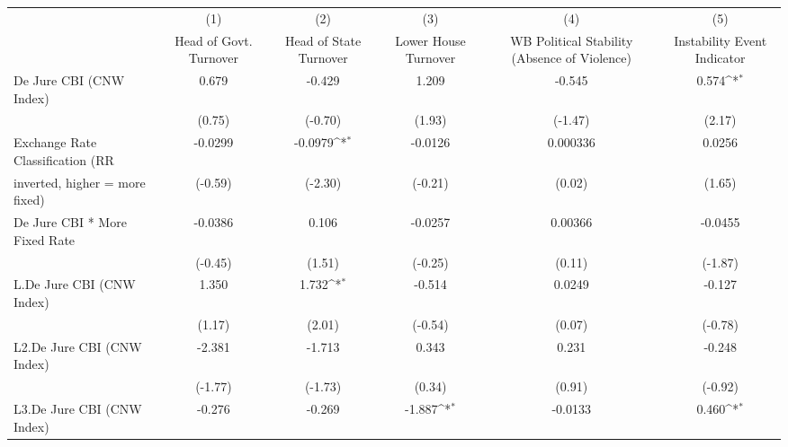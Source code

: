 {
\def\sym#1{\ifmmode^{#1}\else\(^{#1}\)\fi}
\begin{tabular}{l*{5}{c}}
\toprule
                                        &\multicolumn{1}{c}{(1)}&\multicolumn{1}{c}{(2)}&\multicolumn{1}{c}{(3)}&\multicolumn{1}{c}{(4)}&\multicolumn{1}{c}{(5)}\\
                                        &\multicolumn{1}{c}{Head of Govt. Turnover}&\multicolumn{1}{c}{Head of State Turnover}&\multicolumn{1}{c}{Lower House Turnover}&\multicolumn{1}{c}{WB Political Stability (Absence of Violence)}&\multicolumn{1}{c}{Instability Event Indicator}\\
\midrule
De Jure CBI (CNW Index)                 &     0.679         &    -0.429         &     1.209         &    -0.545         &     0.574\sym{*}  \\
                                        &    (0.75)         &   (-0.70)         &    (1.93)         &   (-1.47)         &    (2.17)         \\
\addlinespace
Exchange Rate Classification (RR        &   -0.0299         &   -0.0979\sym{*}  &   -0.0126         &  0.000336         &    0.0256         \\
inverted, higher = more fixed)          &   (-0.59)         &   (-2.30)         &   (-0.21)         &    (0.02)         &    (1.65)         \\
\addlinespace
De Jure CBI * More Fixed Rate           &   -0.0386         &     0.106         &   -0.0257         &   0.00366         &   -0.0455         \\
                                        &   (-0.45)         &    (1.51)         &   (-0.25)         &    (0.11)         &   (-1.87)         \\
\addlinespace
L.De Jure CBI (CNW Index)               &     1.350         &     1.732\sym{*}  &    -0.514         &    0.0249         &    -0.127         \\
                                        &    (1.17)         &    (2.01)         &   (-0.54)         &    (0.07)         &   (-0.78)         \\
\addlinespace
L2.De Jure CBI (CNW Index)              &    -2.381         &    -1.713         &     0.343         &     0.231         &    -0.248         \\
                                        &   (-1.77)         &   (-1.73)         &    (0.34)         &    (0.91)         &   (-0.92)         \\
\addlinespace
L3.De Jure CBI (CNW Index)              &    -0.276         &    -0.269         &    -1.887\sym{*}  &   -0.0133         &     0.460\sym{*}  \\

\end{tabular}}

